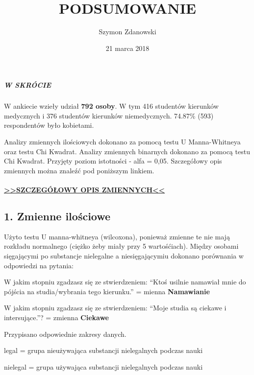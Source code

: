 \documentclass[]{article}
\title{PODSUMOWANIE}
\author{Szymon Zdanowski}
\date{21 marca 2018}
\let\oldparagraph\paragraph
\renewcommand{\paragraph}[1]{\oldparagraph{#1}\mbox{}}
\let\oldsubparagraph\subparagraph
\renewcommand{\subparagraph}[1]{\oldsubparagraph{#1}\mbox{}}
\begin{document}
\maketitle

\subparagraph{W SKRÓCIE}\label{w-skrocie}

W ankiecie wzieły udział \textbf{792 osoby}. W tym 416 studentów
kierunków medycznych i 376 studentów kierunków niemedycznych. 74.87\%
(593) respondentów było kobietami.

Analizy zmiennych ilościowych dokonano za pomocą testu U Manna-Whitneya
oraz testu Chi Kwadrat. Analizy zmiennych binarnych dokonano za pomocą
testu Chi Kwadrat. Przyjęty poziom istotności - alfa = 0,05. Szczegółowy
opis zmiennych można znaleźć pod poniższym linkiem.

\paragraph{\texorpdfstring{\href{http://htmlpreview.github.io/?https://github.com/zdanowski/Ankieta_substancje_psychoaktywne/blob/master/OPIS_ZMIENNYCH.html}{\textgreater{}\textgreater{}SZCZEGÓŁOWY
OPIS
ZMIENNYCH\textless{}\textless{}}}{\textgreater{}\textgreater{}SZCZEGÓŁOWY OPIS ZMIENNYCH\textless{}\textless{}}}\label{szczegoowy-opis-zmiennych}

\subsection{1. Zmienne ilościowe}\label{zmienne-ilosciowe}

Użyto testu U manna-whitneya (wilcoxona), ponieważ zmienne te nie mają
rozkładu normalnego (ciężko żeby miały przy 5 wartośćiach). Między
osobami sięgającymi po substancje nielegalne a niesięgającymiu dokonano
porównania w odpowiedzi na pytania:

W jakim stopniu zgadzasz się ze stwierdzeniem: ``Ktoś usilnie namawiał
mnie do pójścia na studia/wybrania tego kierunku.'' = mienna
\textbf{Namawianie}

W jakim stopniu zgadzasz się ze stwierdzeniem: ``Moje studia są ciekawe
i intersujące.''? = zmienna \textbf{Ciekawe}

Przypisano odpowiednie zakresy danych.

legal = grupa nieużywająca substancji nielegalnych podczas nauki

nielegal = grupa używająca substancji nielegalnych podczas nauki
\end{document}
